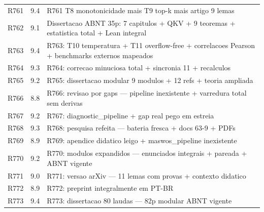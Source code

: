 \begin{tabular}{lll}
R761 & 9.4 & \parbox[t]{9cm}{\raggedright\footnotesize R761 T8 monotonicidade mais T9 top-k mais artigo 9 lemas} \\
R762 & 9.1 & \parbox[t]{9cm}{\raggedright\footnotesize Dissertacao ABNT 35p: 7 capitulos + QKV + 9 teoremas + estatistica total + Lean integral} \\
R763 & 9.4 & \parbox[t]{9cm}{\raggedright\footnotesize R763: T10 temperatura + T11 overflow-free + correlacoes Pearson + benchmarks externos mapeados} \\
R764 & 9.3 & \parbox[t]{9cm}{\raggedright\footnotesize R764: correcao minuciosa total + sincronia 11 + recalculos} \\
R765 & 9.2 & \parbox[t]{9cm}{\raggedright\footnotesize R765: dissertacao modular 9 modulos + 12 refs + teoria ampliada} \\
R766 & 8.8 & \parbox[t]{9cm}{\raggedright\footnotesize R766: revisao por gaps — pipeline inexistente + varredura total sem derivas} \\
R767 & 9.2 & \parbox[t]{9cm}{\raggedright\footnotesize R767: diagnostic\_pipeline + gap real pego em estreia} \\
R768 & 9.3 & \parbox[t]{9cm}{\raggedright\footnotesize R768: pesquisa refeita — bateria fresca + docs 63-9 + PDFs} \\
R769 & 8.9 & \parbox[t]{9cm}{\raggedright\footnotesize R769: apendice didatico leigo + maswos\_pipeline inexistente} \\
R770 & 9.2 & \parbox[t]{9cm}{\raggedright\footnotesize R770: modulos expandidos — enunciados integrais + pareada + ABNT vigente} \\
R771 & 9.0 & \parbox[t]{9cm}{\raggedright\footnotesize R771: versao arXiv — 11 lemas com provas + contexto didatico} \\
R772 & 8.9 & \parbox[t]{9cm}{\raggedright\footnotesize R772: preprint integralmente em PT-BR} \\
R773 & 9.4 & \parbox[t]{9cm}{\raggedright\footnotesize R773: dissertacao 80 laudas — 82p modular ABNT vigente} \\
\bottomrule
\end{tabular}